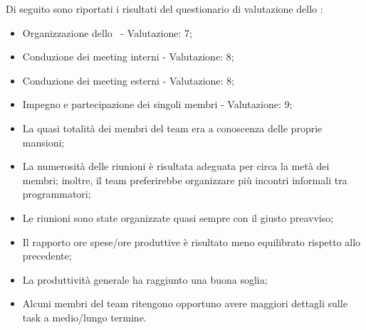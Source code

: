 \par Di seguito sono riportati i risultati del questionario di valutazione dello :
\begin{itemize}
  \item Organizzazione dello \ - Valutazione: 7;
  \item Conduzione dei meeting interni - Valutazione: 8;
  \item Conduzione dei meeting esterni - Valutazione: 8;
  \item Impegno e partecipazione dei singoli membri - Valutazione: 9;
  \item La quasi totalità dei membri del team era a conoscenza delle proprie mansioni;
  \item La numerosità delle riunioni è risultata adeguata per circa la metà dei membri; inoltre, il team preferirebbe organizzare più incontri informali tra programmatori;
  \item Le riunioni sono state organizzate quasi sempre con il giusto preavviso;
  \item Il rapporto ore spese/ore produttive è risultato meno equilibrato rispetto allo  precedente;
  \item La produttività generale ha raggiunto una buona soglia;
  \item Alcuni membri del team ritengono opportuno avere maggiori dettagli sulle task a medio/lungo termine.
\end{itemize}

